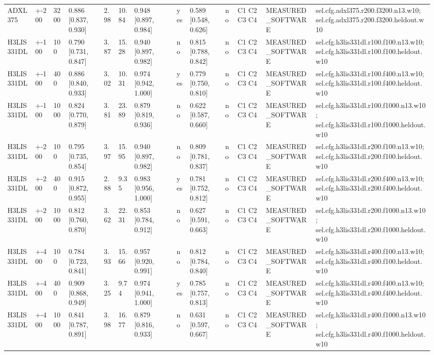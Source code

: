 \begin{table}[t]
\begin{tabular}{llllllllllllll}
ADXL375 & +-200 & 3200 & 0.886 [0.837, 0.930] & 2.98 & 10.84 & 0.948 [0.897, 0.984] &  & yes & 0.589 [0.548, 0.626] & no & C1 C2 C3 C4 & MEASURED\_SOFTWARE & sel.cfg.adxl375.r200.f3200.n13.w10; sel.cfg.adxl375.r200.f3200.heldout.w10 \\
H3LIS331DL & +-100 & 100 & 0.790 [0.731, 0.847] & 3.87 & 15.28 & 0.940 [0.897, 0.982] &  & no & 0.815 [0.788, 0.842] & no & C1 C2 C3 C4 & MEASURED\_SOFTWARE & sel.cfg.h3lis331dl.r100.f100.n13.w10; sel.cfg.h3lis331dl.r100.f100.heldout.w10 \\
H3LIS331DL & +-100 & 400 & 0.886 [0.840, 0.933] & 3.02 & 10.31 & 0.974 [0.942, 1.000] &  & yes & 0.779 [0.750, 0.810] & no & C1 C2 C3 C4 & MEASURED\_SOFTWARE & sel.cfg.h3lis331dl.r100.f400.n13.w10; sel.cfg.h3lis331dl.r100.f400.heldout.w10 \\
H3LIS331DL & +-100 & 1000 & 0.824 [0.770, 0.879] & 3.81 & 23.89 & 0.879 [0.819, 0.936] &  & no & 0.622 [0.587, 0.660] & no & C1 C2 C3 C4 & MEASURED\_SOFTWARE & sel.cfg.h3lis331dl.r100.f1000.n13.w10; sel.cfg.h3lis331dl.r100.f1000.heldout.w10 \\
H3LIS331DL & +-200 & 100 & 0.795 [0.735, 0.854] & 3.97 & 15.95 & 0.940 [0.897, 0.982] &  & no & 0.809 [0.781, 0.837] & no & C1 C2 C3 C4 & MEASURED\_SOFTWARE & sel.cfg.h3lis331dl.r200.f100.n13.w10; sel.cfg.h3lis331dl.r200.f100.heldout.w10 \\
H3LIS331DL & +-200 & 400 & 0.915 [0.872, 0.955] & 2.88 & 9.35 & 0.983 [0.956, 1.000] &  & yes & 0.781 [0.752, 0.812] & no & C1 C2 C3 C4 & MEASURED\_SOFTWARE & sel.cfg.h3lis331dl.r200.f400.n13.w10; sel.cfg.h3lis331dl.r200.f400.heldout.w10 \\
H3LIS331DL & +-200 & 1000 & 0.812 [0.760, 0.870] & 3.62 & 22.31 & 0.853 [0.784, 0.912] &  & no & 0.627 [0.591, 0.663] & no & C1 C2 C3 C4 & MEASURED\_SOFTWARE & sel.cfg.h3lis331dl.r200.f1000.n13.w10; sel.cfg.h3lis331dl.r200.f1000.heldout.w10 \\
H3LIS331DL & +-400 & 100 & 0.784 [0.723, 0.841] & 3.93 & 15.66 & 0.957 [0.920, 0.991] &  & no & 0.812 [0.784, 0.840] & no & C1 C2 C3 C4 & MEASURED\_SOFTWARE & sel.cfg.h3lis331dl.r400.f100.n13.w10; sel.cfg.h3lis331dl.r400.f100.heldout.w10 \\
H3LIS331DL & +-400 & 400 & 0.909 [0.868, 0.949] & 3.25 & 9.74 & 0.974 [0.941, 1.000] &  & yes & 0.785 [0.757, 0.813] & no & C1 C2 C3 C4 & MEASURED\_SOFTWARE & sel.cfg.h3lis331dl.r400.f400.n13.w10; sel.cfg.h3lis331dl.r400.f400.heldout.w10 \\
H3LIS331DL & +-400 & 1000 & 0.841 [0.787, 0.891] & 3.98 & 16.77 & 0.879 [0.816, 0.933] &  & no & 0.631 [0.597, 0.667] & no & C1 C2 C3 C4 & MEASURED\_SOFTWARE & sel.cfg.h3lis331dl.r400.f1000.n13.w10; sel.cfg.h3lis331dl.r400.f1000.heldout.w10 \\

\end{tabular}
\end{table}
